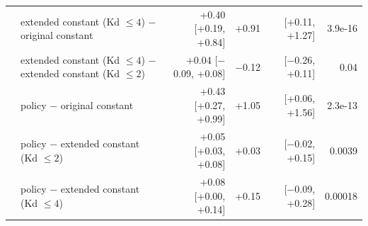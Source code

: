 \begin{table}[t]
\begin{tabular}{llrrrr}
 & extended constant (Kd $\le4$) $-$ original constant & +0.40 [+0.19, +0.84] & +0.91 & [+0.11, +1.27] & 3.9e-16\\
 & extended constant (Kd $\le4$) $-$ extended constant (Kd $\le2$) & +0.04 [$-$0.09, +0.08] & $-$0.12 & [$-$0.26, +0.11] & 0.04\\
 & policy $-$ original constant & +0.43 [+0.27, +0.99] & +1.05 & [+0.06, +1.56] & 2.3e-13\\
 & policy $-$ extended constant (Kd $\le2$) & +0.05 [+0.03, +0.08] & +0.03 & [$-$0.02, +0.15] & 0.0039\\
 & policy $-$ extended constant (Kd $\le4$) & +0.08 [+0.00, +0.14] & +0.15 & [$-$0.09, +0.28] & 0.00018\\
\bottomrule
\end{tabular}
\end{table}
